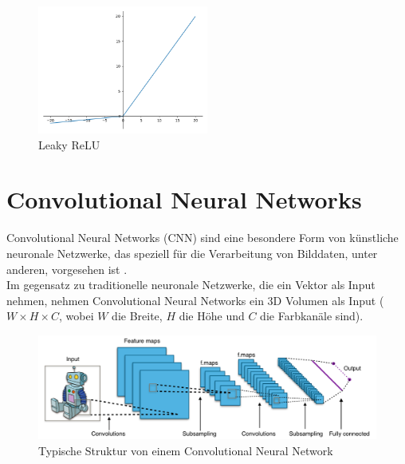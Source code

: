\begin{figure}[H]
  \centering
  \includegraphics[width=0.5\textwidth]{resources/nn/leaky-relu.png}
  \caption{
    Leaky ReLU 
    \cite{leaky-relu}
  }
  \label{image:leaky-relu}
\end{figure}

\section{Convolutional Neural Networks}
Convolutional Neural Networks (\gls{CNN}) sind eine besondere Form von künstliche neuronale Netzwerke, das speziell für 
die Verarbeitung von Bilddaten, unter anderen, vorgesehen ist \cite{convnet-erklaerung}.
\\
Im gegensatz zu traditionelle neuronale Netzwerke, die ein Vektor als Input nehmen, nehmen Convolutional Neural Networks ein 3D Volumen als Input
($ W \times H \times C $, wobei $W$ die Breite, $H$ die Höhe und $C$ die Farbkanäle sind).

\begin{figure}[H]
  \centering
  \includegraphics[width=1\textwidth]{resources/cnn/typical_cnn.png}
  \caption{
    Typische Struktur von einem Convolutional Neural Network
    \cite{typical_cnn_img}
  }
  \label{image:typical_cnn_img}
\end{figure}


